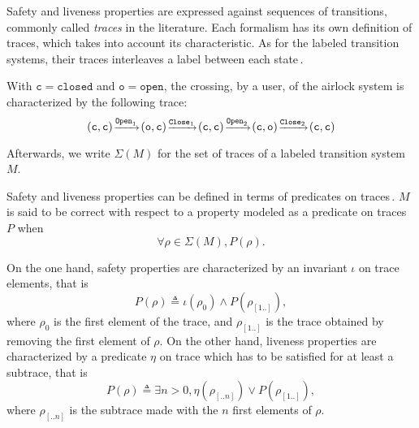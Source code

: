 Safety and liveness properties are expressed against sequences of transitions,
commonly called \emph{traces} in the literature.
%
Each formalism has its own definition of traces, which takes into account its
characteristic.
%
As for the labeled transition systems, their traces interleaves a label between
each state\,\cite{vijayaraghavan2015modular}.

\begin{example}
  With \( \mathtt{c} = \mathtt{closed} \) and \( \mathtt{o} = \mathtt{open} \),
  the crossing, by a user, of the airlock system is characterized by the
  following trace:
  \[
    \footnotesize (\mathtt{c}, \mathtt{c})%
    \!\xrightarrow{\mathtt{Open}_1}\!(\mathtt{o}, \mathtt{c})%
    \!\xrightarrow{\mathtt{Close}_1}\!(\mathtt{c}, \mathtt{c})%
    \!\xrightarrow{\mathtt{Open}_2}\!(\mathtt{c}, \mathtt{o})%
    \!\xrightarrow{\mathtt{Close}_2}\!(\mathtt{c}, \mathtt{c})
  \]
\end{example}


Afterwards, we write \( \Sigma(M) \) for the set of traces of a labeled
transition system \( M \).

Safety and liveness properties can be defined in terms of predicates on
traces\,\cite{alpern1987recognizing,schneider2000enforceable,basin2013enforceable}.
%
\( M \) is said to be correct with respect to a property modeled as a predicate
on traces \( P \) when
%
\[
  \forall \rho \in \Sigma(M), P(\rho).
\]

On the one hand, safety properties are characterized by an invariant \( \iota \)
on trace elements, that is
%
\[
  P(\rho) \triangleq \iota(\rho_0) \wedge P(\rho_{[1..]}),
\]
%
where \( \rho_0 \) is the first element of the trace, and \( \rho_{[1..]} \) is
the trace obtained by removing the first element of \( \rho \).
%
On the other hand, liveness properties are characterized by a predicate
\( \eta \) on trace which has to be satisfied for at least a subtrace, that is
%
\[
  P(\rho) \triangleq \exists n > 0, \eta(\rho_{[..n]}) \vee P(\rho_{[1..]}),
\]
%
where \( \rho_{[..n]} \) is the subtrace made with the \( n \) first elements of
\( \rho \).

